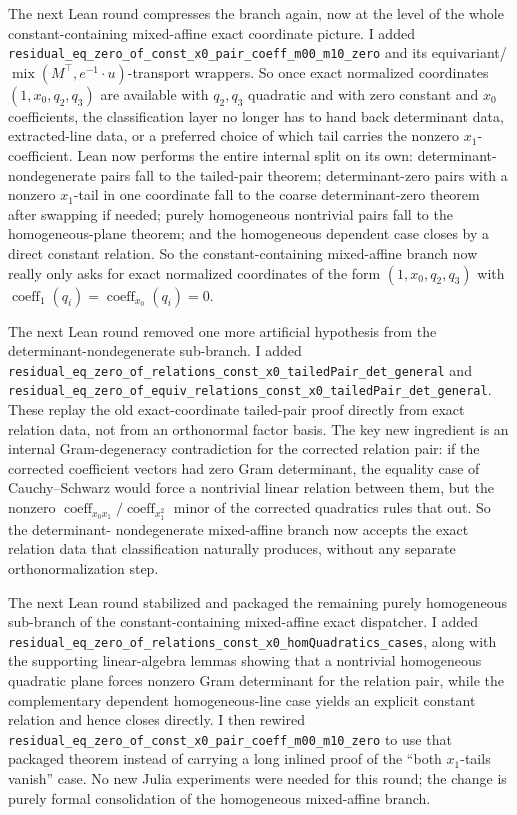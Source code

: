 \documentclass[11pt]{article}
\begin{document}
The next Lean round compresses the branch again, now at the level of the whole
constant-containing mixed-affine exact coordinate picture. I added
\texttt{residual\_eq\_zero\_of\_const\_x0\_pair\_coeff\_m00\_m10\_zero} and
its equivariant/\(\operatorname{mix}(M^\top,e^{-1}\!\cdot u)\)-transport
wrappers. So once exact normalized coordinates
\((1,x_0,q_2,q_3)\) are available with \(q_2,q_3\) quadratic and with zero
constant and \(x_0\) coefficients, the classification layer no longer has to
hand back determinant data, extracted-line data, or a preferred choice of
which tail carries the nonzero \(x_1\)-coefficient. Lean now performs the
entire internal split on its own: determinant-nondegenerate pairs fall to the
tailed-pair theorem; determinant-zero pairs with a nonzero \(x_1\)-tail in one
coordinate fall to the coarse determinant-zero theorem after swapping if
needed; purely homogeneous nontrivial pairs fall to the homogeneous-plane
theorem; and the homogeneous dependent case closes by a direct constant
relation. So the constant-containing mixed-affine branch now really only asks
for exact normalized coordinates of the form \((1,x_0,q_2,q_3)\) with
\(\operatorname{coeff}_{1}(q_i)=\operatorname{coeff}_{x_0}(q_i)=0\).

The next Lean round removed one more artificial hypothesis from the
determinant-nondegenerate sub-branch. I added
\texttt{residual\_eq\_zero\_of\_relations\_const\_x0\_tailedPair\_det\_general}
and
\texttt{residual\_eq\_zero\_of\_equiv\_relations\_const\_x0\_tailedPair\_det\_general}.
These replay the old exact-coordinate tailed-pair proof directly from exact
relation data, not from an orthonormal factor basis. The key new ingredient is
an internal Gram-degeneracy contradiction for the corrected relation pair:
if the corrected coefficient vectors had zero Gram determinant, the equality
case of Cauchy--Schwarz would force a nontrivial linear relation between them,
but the nonzero
\(
\operatorname{coeff}_{x_0x_1}/\operatorname{coeff}_{x_1^2}
\)
minor of the corrected quadratics rules that out. So the determinant-
nondegenerate mixed-affine branch now accepts the exact relation data that
classification naturally produces, without any separate orthonormalization
step.

The next Lean round stabilized and packaged the remaining purely homogeneous
sub-branch of the constant-containing mixed-affine exact dispatcher. I added
\texttt{residual\_eq\_zero\_of\_relations\_const\_x0\_homQuadratics\_cases},
along with the supporting linear-algebra lemmas showing that a nontrivial
homogeneous quadratic plane forces nonzero Gram determinant for the relation
pair, while the complementary dependent homogeneous-line case yields an
explicit constant relation and hence closes directly. I then rewired
\texttt{residual\_eq\_zero\_of\_const\_x0\_pair\_coeff\_m00\_m10\_zero} to use
that packaged theorem instead of carrying a long inlined proof of the
``both \(x_1\)-tails vanish'' case. No new Julia experiments were needed for
this round; the change is purely formal consolidation of the homogeneous
mixed-affine branch.
\end{document}
